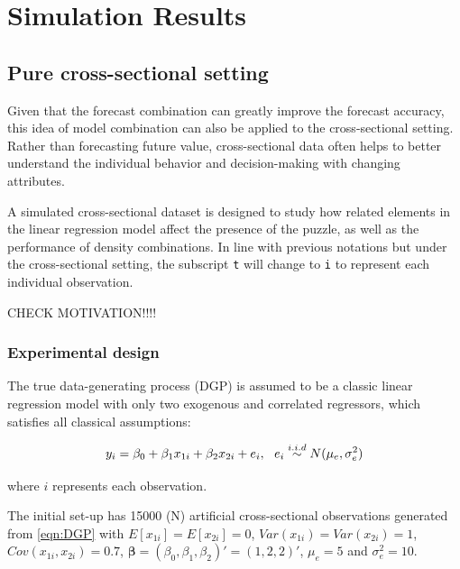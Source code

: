 \documentclass{monashthesis}
\begin{document}
\hypertarget{simulation-results}{%
\chapter{Simulation Results}\label{simulation-results}}

\hypertarget{pure-cross-sectional-setting}{%
\section{Pure cross-sectional setting}\label{pure-cross-sectional-setting}}

Given that the forecast combination can greatly improve the forecast accuracy, this idea of model combination can also be applied to the cross-sectional setting. Rather than forecasting future value, cross-sectional data often helps to better understand the individual behavior and decision-making with changing attributes.

A simulated cross-sectional dataset is designed to study how related elements in the linear regression model affect the presence of the puzzle, as well as the performance of density combinations. In line with previous notations but under the cross-sectional setting, the subscript \texttt{t} will change to \texttt{i} to represent each individual observation.

CHECK MOTIVATION!!!!

\hypertarget{experimental-design}{%
\subsection{Experimental design}\label{experimental-design}}

The true data-generating process (DGP) is assumed to be a classic linear regression model with only two exogenous and correlated regressors, which satisfies all classical assumptions:

\begin{equation}
\label{eqn:DGP}
y_i = \beta_0 + \beta_1 x_{1i} + \beta_2 x_{2i} + e_i, \ \ e_i \stackrel{i.i.d}{\sim} N(\mu_e,\sigma^2_e) \\
\end{equation}

where \(i\) represents each observation.

The initial set-up has 15000 (N) artificial cross-sectional observations generated from \ref{eqn:DGP} with \(E[x_{1i}] = E[x_{2i}] = 0\), \(Var(x_{1i}) = Var(x_{2i}) = 1\), \(Cov(x_{1i}, x_{2i}) = 0.7\), \(\pmb{\beta} = (\beta_0, \beta_1, \beta_2)' = (1,2,2)'\), \(\mu_e = 5\) and \(\sigma^2_e=10\).
\end{document}
